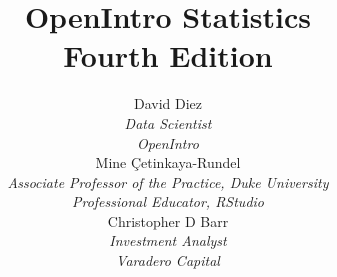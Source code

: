 
\title{\huge OpenIntro Statistics\vspace{1.5mm} \\
    \Large Fourth Edition}
\author{David Diez \\
\small\emph{Data Scientist}\\
\small\emph{OpenIntro} \\[6mm]
Mine \c{C}etinkaya-Rundel \\
\small\emph{Associate Professor of the Practice,
    Duke University} \\
\small\emph{Professional Educator, RStudio} \\[6mm]
Christopher D Barr \\
\small\emph{Investment Analyst} \\
\small\emph{Varadero Capital} \\
}
